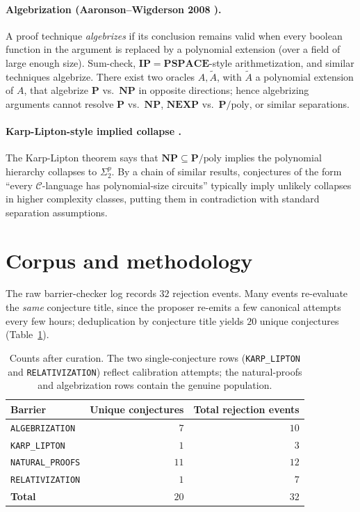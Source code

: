 \documentclass[11pt,a4paper]{article}
\begin{document}
\paragraph{Algebrization (Aaronson--Wigderson 2008 \cite{AaronsonWigderson2008}).}
A proof technique \emph{algebrizes} if its conclusion remains valid
when every boolean function in the argument is replaced by a
polynomial extension (over a field of large enough size). Sum-check,
$\mathbf{IP} = \mathbf{PSPACE}$-style arithmetization, and similar techniques
algebrize. There exist two oracles $A, \tilde A$, with $\tilde A$ a
polynomial extension of $A$, that algebrize $\mathbf{P}$ vs.\ $\mathbf{NP}$ in
opposite directions; hence algebrizing arguments cannot resolve
$\mathbf{P}$ vs.\ $\mathbf{NP}$, $\mathbf{NEXP}$ vs.\ $\mathbf{P}/\mathrm{poly}$, or
similar separations.

\paragraph{Karp-Lipton-style implied collapse \cite{KarpLipton1980}.}
The Karp-Lipton theorem says that $\mathbf{NP} \subseteq \mathbf{P}/\mathrm{poly}$
implies the polynomial hierarchy collapses to $\Sigma_2^p$. By a chain
of similar results, conjectures of the form
``every $\mathcal{C}$-language has polynomial-size circuits'' typically
imply unlikely collapses in higher complexity classes, putting them in
contradiction with standard separation assumptions.

\section{Corpus and methodology}\label{sec:corpus}

The raw barrier-checker log records $32$ rejection events. Many events
re-evaluate the \emph{same} conjecture title, since the proposer
re-emits a few canonical attempts every few hours; deduplication by
conjecture title yields $20$ unique conjectures (Table~\ref{tab:counts}).

\begin{table}[h]
\centering
\small
\begin{tabular}{l r r}
\toprule
Barrier & Unique conjectures & Total rejection events \\
\midrule
\texttt{ALGEBRIZATION}    & $7$  & $10$ \\
\texttt{KARP\_LIPTON}     & $1$  & $3$  \\
\texttt{NATURAL\_PROOFS}  & $11$ & $12$ \\
\texttt{RELATIVIZATION}   & $1$  & $7$  \\
\midrule
\textbf{Total}            & $20$ & $32$ \\
\bottomrule
\end{tabular}
\caption{Counts after curation. The two single-conjecture rows
(\texttt{KARP\_LIPTON} and \texttt{RELATIVIZATION}) reflect calibration
attempts; the natural-proofs and algebrization rows contain the
genuine population.}
\label{tab:counts}
\end{table}
\end{document}
